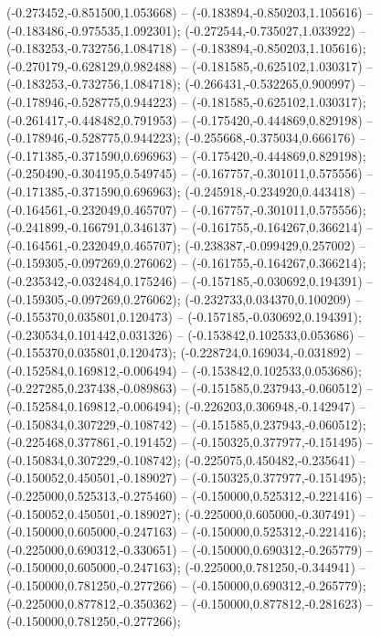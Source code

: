  (-0.273452,-0.851500,1.053668) -- (-0.183894,-0.850203,1.105616) -- (-0.183486,-0.975535,1.092301);
 (-0.272544,-0.735027,1.033922) -- (-0.183253,-0.732756,1.084718) -- (-0.183894,-0.850203,1.105616);
 (-0.270179,-0.628129,0.982488) -- (-0.181585,-0.625102,1.030317) -- (-0.183253,-0.732756,1.084718);
 (-0.266431,-0.532265,0.900997) -- (-0.178946,-0.528775,0.944223) -- (-0.181585,-0.625102,1.030317);
 (-0.261417,-0.448482,0.791953) -- (-0.175420,-0.444869,0.829198) -- (-0.178946,-0.528775,0.944223);
 (-0.255668,-0.375034,0.666176) -- (-0.171385,-0.371590,0.696963) -- (-0.175420,-0.444869,0.829198);
 (-0.250490,-0.304195,0.549745) -- (-0.167757,-0.301011,0.575556) -- (-0.171385,-0.371590,0.696963);
 (-0.245918,-0.234920,0.443418) -- (-0.164561,-0.232049,0.465707) -- (-0.167757,-0.301011,0.575556);
 (-0.241899,-0.166791,0.346137) -- (-0.161755,-0.164267,0.366214) -- (-0.164561,-0.232049,0.465707);
 (-0.238387,-0.099429,0.257002) -- (-0.159305,-0.097269,0.276062) -- (-0.161755,-0.164267,0.366214);
 (-0.235342,-0.032484,0.175246) -- (-0.157185,-0.030692,0.194391) -- (-0.159305,-0.097269,0.276062);
 (-0.232733,0.034370,0.100209) -- (-0.155370,0.035801,0.120473) -- (-0.157185,-0.030692,0.194391);
 (-0.230534,0.101442,0.031326) -- (-0.153842,0.102533,0.053686) -- (-0.155370,0.035801,0.120473);
 (-0.228724,0.169034,-0.031892) -- (-0.152584,0.169812,-0.006494) -- (-0.153842,0.102533,0.053686);
 (-0.227285,0.237438,-0.089863) -- (-0.151585,0.237943,-0.060512) -- (-0.152584,0.169812,-0.006494);
 (-0.226203,0.306948,-0.142947) -- (-0.150834,0.307229,-0.108742) -- (-0.151585,0.237943,-0.060512);
 (-0.225468,0.377861,-0.191452) -- (-0.150325,0.377977,-0.151495) -- (-0.150834,0.307229,-0.108742);
 (-0.225075,0.450482,-0.235641) -- (-0.150052,0.450501,-0.189027) -- (-0.150325,0.377977,-0.151495);
 (-0.225000,0.525313,-0.275460) -- (-0.150000,0.525312,-0.221416) -- (-0.150052,0.450501,-0.189027);
 (-0.225000,0.605000,-0.307491) -- (-0.150000,0.605000,-0.247163) -- (-0.150000,0.525312,-0.221416);
 (-0.225000,0.690312,-0.330651) -- (-0.150000,0.690312,-0.265779) -- (-0.150000,0.605000,-0.247163);
 (-0.225000,0.781250,-0.344941) -- (-0.150000,0.781250,-0.277266) -- (-0.150000,0.690312,-0.265779);
 (-0.225000,0.877812,-0.350362) -- (-0.150000,0.877812,-0.281623) -- (-0.150000,0.781250,-0.277266);
